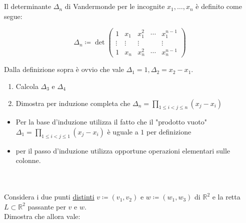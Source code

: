 \documentclass[a4paper,10pt]{article}
\begin{document}


\bigskip


 \\\\
    Il determinante $\Delta_{n}$ di Vandermonde per le incognite $x_{1}, \dots, x_{n}$ è definito come segue:

        $$
        \Delta_{n} \coloneqq \det{
        \begin{pmatrix}
            1 & x_{1} & x_{1}^{2} & \cdots & x_{1}^{n-1} \\
            \vdots & \vdots & \vdots & & \vdots \\
            1 & x_{n} & x_{n}^{2} & \cdots & x_{n}^{n-1}
        \end{pmatrix}
        }
        $$

    Dalla definizione sopra è ovvio che vale $\Delta_{1}=1, \Delta_{2}=x_{2}-x_{1}$.
    \begin{enumerate}
        \item Calcola $\Delta_{3}$ e $\Delta_{4}$
        \item Dimostra per induzione completa che $\Delta_{n}=\displaystyle\prod_{ 1 \leq i < j \leq n }(x_{j} - x_{i})$
    \end{enumerate}




    \setlength{\parindent}{5ex}

    \begin{itemize}[leftmargin=10ex]        
        \item
            Per la base d'induzione utilizza il fatto che il "prodotto vuoto" 
            $\Delta_{1}=\displaystyle\prod_{ 1 \leq i < j \leq 1 }(x_{j} - x_{i})$
            è uguale a $1$ per definizione
        \item per il passo d'induzione utilizza opportune operazioni elementari sulle colonne.
    \end{itemize}

    \setlength{\parindent}{0ex}



\bigskip


 \\\\
    Considera i due punti \underline{distinti} 
    $v\coloneqq(v_{1},v_{2})$
    e
    $w\coloneqq(w_{1},w_{3})$
    di $\mathbb{R}^{2}$
    e la retta $L \subset \mathbb{R}^{2}$ passante per $v$ e $w$.
    \\
    Dimostra che allora vale:
\end{document}
